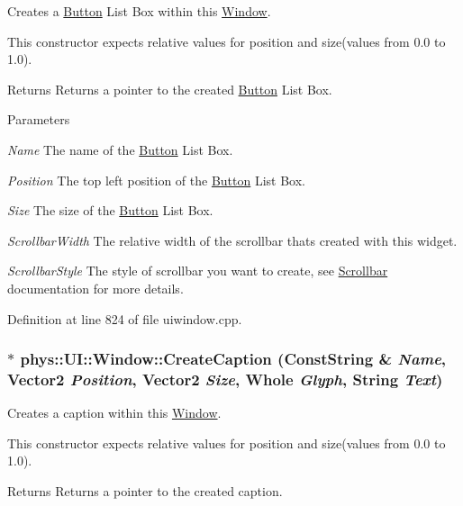 Creates a \hyperlink{classphys_1_1UI_1_1Button}{Button} List Box within this \hyperlink{classphys_1_1UI_1_1Window}{Window}. 

This constructor expects relative values for position and size(values from 0.0 to 1.0). \begin{DoxyReturn}{Returns}
Returns a pointer to the created \hyperlink{classphys_1_1UI_1_1Button}{Button} List Box. 
\end{DoxyReturn}

\begin{DoxyParams}{Parameters}
\item[{\em Name}]The name of the \hyperlink{classphys_1_1UI_1_1Button}{Button} List Box. \item[{\em Position}]The top left position of the \hyperlink{classphys_1_1UI_1_1Button}{Button} List Box. \item[{\em Size}]The size of the \hyperlink{classphys_1_1UI_1_1Button}{Button} List Box. \item[{\em ScrollbarWidth}]The relative width of the scrollbar thats created with this widget. \item[{\em ScrollbarStyle}]The style of scrollbar you want to create, see \hyperlink{classphys_1_1UI_1_1Scrollbar}{Scrollbar} documentation for more details. \end{DoxyParams}


Definition at line 824 of file uiwindow.cpp.

\hypertarget{classphys_1_1UI_1_1Window_a840c88419fc2874f6b2520c238bf33f1}{
\subsubsection[{CreateCaption}]{ $\ast$ phys::UI::Window::CreateCaption ({\bf ConstString} \& {\em Name}, \/  {\bf Vector2} {\em Position}, \/  {\bf Vector2} {\em Size}, \/  {\bf Whole} {\em Glyph}, \/  {\bf String} {\em Text})}}
\label{d4/d86/classphys_1_1UI_1_1Window_a840c88419fc2874f6b2520c238bf33f1}


Creates a caption within this \hyperlink{classphys_1_1UI_1_1Window}{Window}. 

This constructor expects relative values for position and size(values from 0.0 to 1.0). \begin{DoxyReturn}{Returns}
Returns a pointer to the created caption. 
\end{DoxyReturn}

